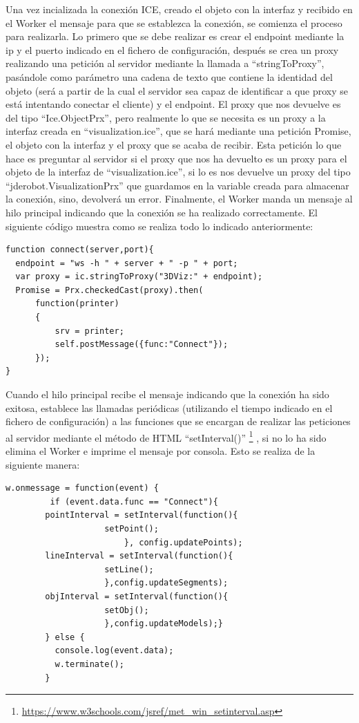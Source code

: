 Una vez incializada la conexión ICE, creado el objeto con la interfaz y recibido en el Worker el mensaje para que se establezca la conexión, se comienza el proceso para realizarla. Lo primero que se debe realizar es crear el endpoint mediante la ip y el puerto indicado en el fichero de configuración, después se crea un proxy realizando una petición al servidor mediante la llamada a ``stringToProxy'', pasándole como parámetro una cadena de texto que contiene la identidad del objeto (será a partir de la cual el servidor sea capaz de identificar a que proxy se está intentando conectar el cliente) y el endpoint. El proxy que nos devuelve es del tipo ``Ice.ObjectPrx'', pero realmente lo que se necesita es un proxy a la interfaz creada en ``visualization.ice'', que se hará mediante una petición Promise, el objeto con la interfaz y el proxy que se acaba de recibir. Esta petición lo que hace es preguntar al servidor si el proxy que nos ha devuelto es un proxy para el objeto de la interfaz de ``visualization.ice'', si lo es nos devuelve un proxy del tipo ``jderobot.VisualizationPrx'' que guardamos en la variable creada para almacenar la conexión, sino, devolverá un error.  Finalmente, el Worker manda un mensaje al hilo principal indicando que la conexión se ha realizado correctamente. El siguiente código muestra como se realiza todo lo indicado anteriormente:

\begin{lstlisting}[frame=single]
function connect(server,port){
  endpoint = "ws -h " + server + " -p " + port;
  var proxy = ic.stringToProxy("3DViz:" + endpoint);
  Promise = Prx.checkedCast(proxy).then(
      function(printer)
      {
          srv = printer;
          self.postMessage({func:"Connect"});
      });
}
\end{lstlisting}

Cuando el hilo principal recibe el mensaje indicando que la conexión ha sido exitosa, establece las llamadas periódicas (utilizando el tiempo indicado en el fichero de configuración) a las funciones que se encargan de realizar las peticiones al servidor mediante el método de HTML ``setInterval()'' \footnote{\url{https://www.w3schools.com/jsref/met_win_setinterval.asp}} , si no lo ha sido elimina el Worker e imprime el mensaje por consola. Esto se realiza de la siguiente manera:

\begin{lstlisting}[frame=single]
w.onmessage = function(event) {
      	 if (event.data.func == "Connect"){
		pointInterval = setInterval(function(){
					setPoint();
						}, config.updatePoints);
		lineInterval = setInterval(function(){
					setLine();
					},config.updateSegments);
		objInterval = setInterval(function(){
					setObj();
					},config.updateModels);}	
        } else {
          console.log(event.data);
          w.terminate();
        }
\end{lstlisting}

